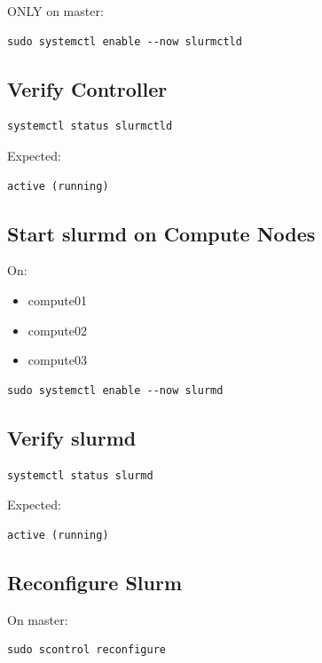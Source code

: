 \documentclass[11pt]{article}
\begin{document}
ONLY on master:

\begin{verbatim}
sudo systemctl enable --now slurmctld
\end{verbatim}
\subsection{Verify Controller}
\label{sec:org85bcb0a}

\begin{verbatim}
systemctl status slurmctld
\end{verbatim}

Expected:

\begin{verbatim}
active (running)
\end{verbatim}
\subsection{Start slurmd on Compute Nodes}
\label{sec:org223e182}

On:
\begin{itemize}
\item compute01
\item compute02
\item compute03
\end{itemize}

\begin{verbatim}
sudo systemctl enable --now slurmd
\end{verbatim}
\subsection{Verify slurmd}
\label{sec:orge49ae4a}

\begin{verbatim}
systemctl status slurmd
\end{verbatim}

Expected:

\begin{verbatim}
active (running)
\end{verbatim}
\subsection{Reconfigure Slurm}
\label{sec:orgffe7c00}

On master:

\begin{verbatim}
sudo scontrol reconfigure
\end{verbatim}
\end{document}
